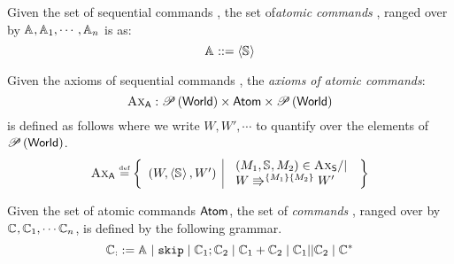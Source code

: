 %
%
\begin{definition}
Given the set of sequential commands \Seqs, the set of\emph{atomic commands} \Atoms, ranged over by $\mathbb{A}_{}, \mathbb{A}_{1}, \cdots, \mathbb{A}_{n}$ is as:
%
\[
	\mathbb{A}_{} ::=  \left\langle \mathbb{S}_{} \right\rangle
\]
%
\end{definition}
%
%
\begin{definition}\label{def:atomic-command-axioms}
Given the axioms of sequential commands \AxiomsSeq, the \emph{axioms of atomic commands}:
%
\[
	\textsc{Ax}_{\textsf{A}} : \mathscr{P}\left(\textsf{World} \right) \times \textsf{Atom} \times \mathscr{P}\left(\textsf{World} \right)
\]
%
is defined as follows where we write $W, W', \cdots$ to quantify over the elements of $\mathscr{P}\left(\textsf{World} \right)$.
%
\[
\begin{array}{@{} r @{\hspace{2pt}}l @{}}

	\AxiomsA \eqdef & 
%		
	\left\{ 
	\begin{array}{l | l}
		\left(W, \atomic{\seq{}}, W' \right)	& 
		\begin{array}{l}
			\left(M_1, \seq{}, M_2 \right) \in \AxiomsSeq /| \\ 
			\repartitions{W}{W'}{M_1}{M_2}	
		\end{array}
	\end{array}
	\right\}\\
	
	
\end{array}
\]
%
\end{definition}
%
\begin{definition}
Given the set of atomic commands $\textsf{Atom}$, the set of \colosl \emph{commands} \Coms, ranged over by $\mathbb{C}_{}, \mathbb{C}_{1}, \cdots \mathbb{C}_{n}$, is defined by the following grammar.
\[
	\mathbb{C}_{:}:= \mathbb{A}_{} \mid \mathtt{skip} \mid \mathbb{C}_{1}; \mathbb{C}_{2} \mid \mathbb{C}_{1} + \mathbb{C}_{2} \mid \mathbb{C}_{1} || \mathbb{C}_{2} \mid \mathbb{C}_{}^{*}
\]
\end{definition}
%
%
